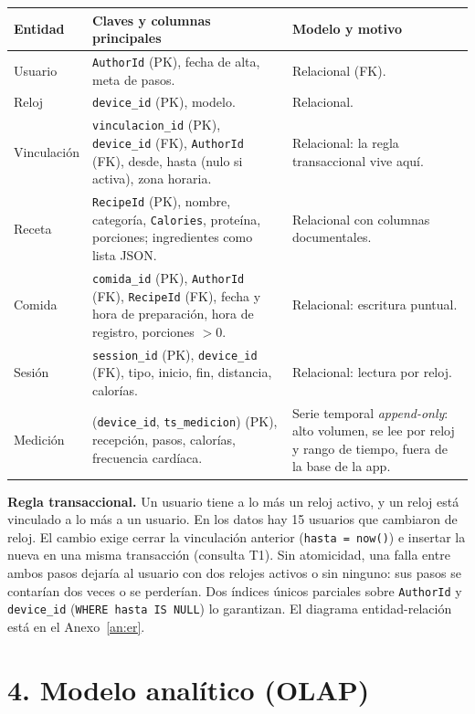 \documentclass[11pt]{article}
\newcommand{\seccion}[1]{\vspace{-1.2ex}\section*{#1}\vspace{-0.6ex}}
\newcommand{\codigo}[1]{\texttt{\small #1}}
\begin{document}
{\small
\begin{tabularx}{\linewidth}{@{}>{\raggedright\arraybackslash}p{1.6cm}>{\raggedright\arraybackslash}X>{\raggedright\arraybackslash}p{4.4cm}@{}}
\toprule
\textbf{Entidad} & \textbf{Claves y columnas principales} &
\textbf{Modelo y motivo}\\
\midrule
Usuario &
\codigo{AuthorId} (PK), fecha de alta, meta de pasos. &
Relacional (FK).\\
Reloj &
\codigo{device\_id} (PK), modelo. &
Relacional.\\
Vinculación &
\codigo{vinculacion\_id} (PK), \codigo{device\_id} (FK),
\codigo{AuthorId} (FK), desde, hasta (nulo si activa), zona horaria. &
Relacional: la regla transaccional vive aquí.\\
Receta &
\codigo{RecipeId} (PK), nombre, categoría, \codigo{Calories},
proteína, porciones; ingredientes como lista JSON. &
Relacional con columnas documentales.\\
Comida &
\codigo{comida\_id} (PK), \codigo{AuthorId} (FK), \codigo{RecipeId} (FK),
fecha y hora de preparación, hora de registro, porciones $> 0$. &
Relacional: escritura puntual.\\
Sesión &
\codigo{session\_id} (PK), \codigo{device\_id} (FK), tipo, inicio, fin,
distancia, calorías. &
Relacional: lectura por reloj.\\
Medición &
(\codigo{device\_id}, \codigo{ts\_medicion}) (PK), recepción, pasos,
calorías, frecuencia cardíaca. &
Serie temporal \emph{append-only}: alto volumen, se lee por reloj y
rango de tiempo, fuera de la base de la app.\\
\bottomrule
\end{tabularx}
}

\textbf{Regla transaccional.} Un usuario tiene a lo más un reloj
activo, y un reloj está vinculado a lo más a un usuario. En los datos
hay 15 usuarios que cambiaron de reloj. El cambio exige cerrar la
vinculación anterior (\codigo{hasta = now()}) e insertar la nueva en
una misma transacción (consulta T1). Sin atomicidad, una falla entre
ambos pasos dejaría al usuario con dos relojes activos o sin ninguno:
sus pasos se contarían dos veces o se perderían. Dos índices únicos
parciales sobre \codigo{AuthorId} y \codigo{device\_id}
(\codigo{WHERE hasta IS NULL}) lo garantizan. El diagrama
entidad-relación está en el Anexo~\ref{an:er}.

\seccion{4. Modelo analítico (OLAP)}
\end{document}
